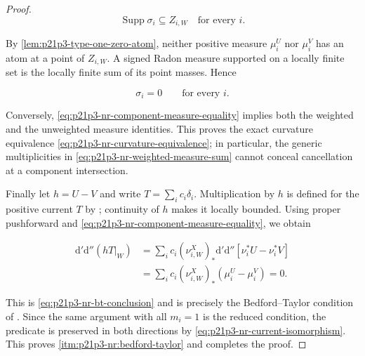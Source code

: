 \begin{proof}
\[
                       \operatorname{Supp}\sigma_i\subseteq Z_{i,W}
                       \quad\text{for every }i.
\]

By \cref{lem:p21p3-type-one-zero-atom}, neither positive measure
\(\mu_i^U\) nor \(\mu_i^V\) has an atom at a point of \(Z_{i,W}\).  A signed
Radon measure supported on a locally finite set is the locally finite sum
of its point masses.  Hence

\begin{equation}
\label{eq:p21p3-nr-component-measure-equality}
                         \sigma_i=0\qquad\text{for every }i.
\end{equation}

Conversely, \eqref{eq:p21p3-nr-component-measure-equality} implies both
the weighted and the unweighted measure identities.  This proves the exact
curvature equivalence \eqref{eq:p21p3-nr-curvature-equivalence}; in
particular, the generic multiplicities in
\eqref{eq:p21p3-nr-weighted-measure-sum} cannot conceal cancellation at a
component intersection.

Finally let \(h=U-V\) and write \(T=\sum_i c_i\delta_i\).  Multiplication by
\(h\) is defined for the positive current \(T\) by
\cite[Example~7.2.12]{CLD25}; continuity of \(h\) makes it locally bounded.
Using proper pushforward and
\eqref{eq:p21p3-nr-component-measure-equality}, we obtain

\begin{align*}
 \mathrm d'\mathrm d''(hT|_W)
 &=\sum_i c_i(\nu_{i,W}^{X})_*
     \mathrm d'\mathrm d''
       [\nu_i^*U-\nu_i^*V]\\
 &=\sum_i c_i(\nu_{i,W}^{X})_*(\mu_i^U-\mu_i^V)=0.
\end{align*}

This is \eqref{eq:p21p3-nr-bt-conclusion} and is precisely the
Bedford--Taylor condition of \cite[Definition~8.6.2]{CLD25}.  Since the
same argument with all \(m_i=1\) is the reduced condition, the predicate is
preserved in both directions by \eqref{eq:p21p3-nr-current-isomorphism}.
This proves \cref{itm:p21p3-nr:bedford-taylor} and completes the proof.
\end{proof}

